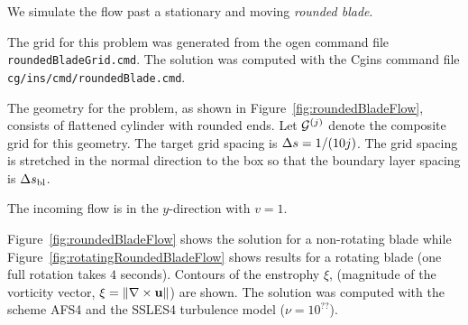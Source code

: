 {We simulate the flow past a stationary and moving {\em rounded blade}.

The grid for this problem was generated from the ogen command file {\tt roundedBladeGrid.cmd}.
The solution was computed with the Cgins command file {\tt cg/ins/cmd/roundedBlade.cmd}.

The geometry for the problem, as shown in Figure~\ref{fig:roundedBladeFlow},
consists of flattened cylinder with rounded ends.
Let ${\mathcal G}^{(j)}$ denote the composite grid for this geometry. The target grid spacing is $\Delta s=1/(10 j)$.
The grid spacing is stretched in the normal direction to the box so that the boundary layer
spacing is $\Delta s_{\rm bl}$. 


The incoming flow is in the $y$-direction with $v=1$.


Figure~\ref{fig:roundedBladeFlow} shows the solution for a non-rotating blade while
Figure~\ref{fig:rotatingRoundedBladeFlow} shows results for a rotating blade (one full rotation takes $4$ seconds).
Contours of the enstrophy $\xi$, (magnitude of the vorticity vector, $\xi=\| \nabla\times \mathbf{ u}\|$) are shown.
The solution was computed with the scheme AFS4 and the SSLES4 turbulence model ($\nu=10^{??}$). 




}
